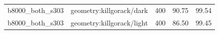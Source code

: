 \begin{longtable}{l>{\raggedright\arraybackslash}p{.42\linewidth}rrr}
b8000\_\allowbreak{}both\_\allowbreak{}s303 & %
geometry:killgorack/dark & %
400 & %
90.75 & %
99.54 \\ %

b8000\_\allowbreak{}both\_\allowbreak{}s303 & %
geometry:killgorack/light & %
400 & %
86.50 & %
99.45 \\ %


\end{longtable}
